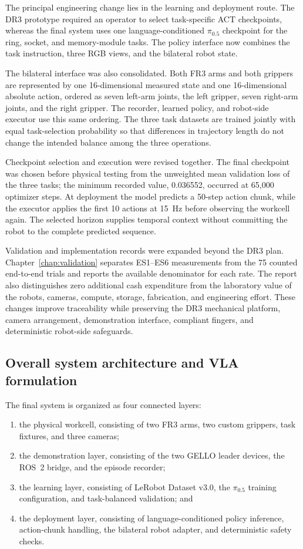 The principal engineering change lies in the learning and deployment route. The
DR3 prototype required an operator to select task-specific ACT checkpoints,
whereas the final system uses one language-conditioned $\pi_{0.5}$ checkpoint
for the ring, socket, and memory-module tasks. The policy interface now combines
the task instruction, three RGB views, and the bilateral robot state.

The bilateral interface was also consolidated. Both FR3 arms and both grippers
are represented by one 16-dimensional measured state and one 16-dimensional
absolute action, ordered as seven left-arm joints, the left gripper, seven
right-arm joints, and the right gripper. The recorder, learned policy, and
robot-side executor use this same ordering. The three task datasets are trained
jointly with equal task-selection probability so that differences in trajectory
length do not change the intended balance among the three operations.

Checkpoint selection and execution were revised together. The final checkpoint
was chosen before physical testing from the unweighted mean validation loss of
the three tasks; the minimum recorded value, 0.036552, occurred at 65,000
optimizer steps. At deployment the model predicts a 50-step action chunk, while
the executor applies the first 10 actions at 15~Hz before observing the
workcell again. The selected horizon supplies temporal context without
committing the robot to the complete predicted sequence.

Validation and implementation records were expanded beyond the DR3 plan.
Chapter~\ref{chap:validation} separates ES1--ES6 measurements from the 75
counted end-to-end trials and reports the available denominator for each rate.
The report also distinguishes zero additional cash expenditure from the
laboratory value of the robots, cameras, compute, storage, fabrication, and
engineering effort. These changes improve traceability while preserving the
DR3 mechanical platform, camera arrangement, demonstration interface,
compliant fingers, and deterministic robot-side safeguards.

\subsection{Overall system architecture and VLA formulation}

The final system is organized as four connected layers:
\begin{enumerate}
  \item the physical workcell, consisting of two FR3 arms, two custom grippers, task fixtures, and three cameras;
  \item the demonstration layer, consisting of the two GELLO leader devices, the ROS~2 bridge, and the episode recorder;
  \item the learning layer, consisting of LeRobot Dataset v3.0, the $\pi_{0.5}$ training configuration, and task-balanced validation; and
  \item the deployment layer, consisting of language-conditioned policy inference, action-chunk handling, the bilateral robot adapter, and deterministic safety checks.
\end{enumerate}


